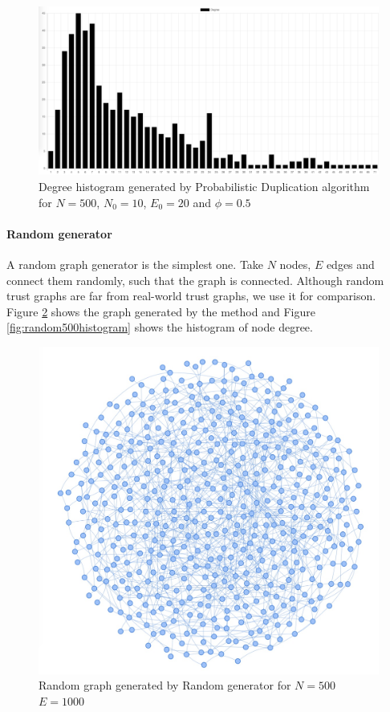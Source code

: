 \begin{figure}[h!]
    \includegraphics[width=\textwidth]{img/propDup500Hist.png}
    \centering
    \caption{Degree histogram generated by Probabilistic Duplication algorithm for $N=500$, $N_0=10$, $E_0=20$ and $\phi = 0.5$}
    \label{fig:propdup500histogram}
\end{figure} 

\paragraph{Random generator}

A random graph generator is the simplest one. Take $N$ nodes, $E$ edges and connect them randomly, such that the graph is connected. Although random trust graphs are far from  real-world trust graphs, we use it for comparison. Figure \ref{fig:random500graph} shows the graph generated by the method and Figure \ref{fig:random500histogram} shows the histogram of node degree.

\begin{figure}[h!]
    \includegraphics[width=\textwidth]{img/random500Graph.jpg}
    \centering
    \caption{Random graph generated by Random generator for $N=500$ $E=1000$}
    \label{fig:random500graph}
\end{figure}

